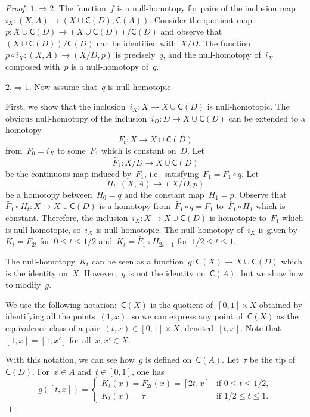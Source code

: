 \documentclass[english,11pt]{article}
\theoremstyle{plain}
\theoremstyle{remark}
\theoremstyle{definition}
\newcommand{\C}[1]{\mathsf{C}(#1)}%
\begin{document}
\begin{proof}
$1.\Rightarrow 2.$ The function~$f$ is a null-homotopy for pairs of the inclusion map~$i_{X}:(X,A)\to (X\cup\C D,\C{A})$. Consider the quotient map~$p:X\cup\C D\to(X\cup\C D)/\C D$ and observe that~$(X\cup\C D)/\C D$ can be identified with~$X/D$. The function~$p\circ i_{X}:(X,A)\to (X/D,p)$ is precisely~$q$, and the null-homotopy of~$i_{X}$ composed with~$p$ is a null-homotopy of~$q$.

$2.\Rightarrow 1.$ Now assume that~$q$ is null-homotopic.

First, we show that the inclusion~$i_{X}:X\to X\cup\C D$
is null-homotopic. The obvious null-homotopy of the inclusion~$i_D:D\to X\cup \C{D}$ can be extended to a homotopy
\begin{equation*}
F_t:X\to X\cup \C{D}
\end{equation*}
from~$F_0=i_X$ to some~$F_1$ which is constant on~$D$. Let
\begin{equation*}
\widetilde{F_{1}}:X/D\to X\cup\C D
\end{equation*}
be the continuous map induced by~$F_{1}$, i.e.~satisfying~$F_{1}=\widetilde{F_{1}}\circ q$. Let
\begin{equation*}
H_{t}:(X,A)\to (X/D,p)
\end{equation*}
be a homotopy between~$H_{0}=q$ and the constant map~$H_{1}=p$. Observe that~$\widetilde{F_{1}}\circ H_{t}:X\to X\cup\C D$ is a homotopy from~$\widetilde{F_{1}}\circ q=F_{1}$ to~$\widetilde{F_{1}}\circ H_{1}$ which is constant. Therefore, the inclusion~$i_{X}:X\to X\cup\C D$ is homotopic to~$F_{1}$ which is null-homotopic, so~$i_{X}$ is
null-homotopic. The null-homotopy of~$i_X$ is given by~$K_{t}=F_{2t}$ for~$0\leq t\leq1/2$
and~$K_{t}=\widetilde{F_{1}}\circ H_{2t-1}$ for~$1/2\leq t\leq 1$.

The null-homotopy~$K_{t}$ can be seen as a function~$g:\C X\to X\cup\C D$ which is the identity on~$X$. However,~$g$ is not the identity on~$\C{A}$, but we show how to modify~$g$.

We use the following notation:~$\C{X}$ is the quotient of~$[0,1]\times X$ obtained by identifying all the points~$(1,x)$, so we can express any point of~$\C{X}$ as the equivalence class of a pair~$(t,x)\in [0,1]\times X$, denoted~$[t,x]$. Note that~$[1,x]=[1,x']$ for all~$x,x'\in X$.

With this notation, we can see how~$g$ is defined on~$\C{A}$. Let~$\tau$ be the tip of~$\C{D}$. For~$x\in A$ and~$t\in[0,1]$, one has
\begin{equation*}
g([t,x])=\begin{cases}
K_{t}(x)=F_{2t}(x)=[2t,x]&\text{if }0\leq t\leq 1/2,\\
K_{t}(x)=\tau&\text{if }1/2\leq t\leq 1.
\end{cases}
\end{equation*}


\end{proof}
\end{document}
